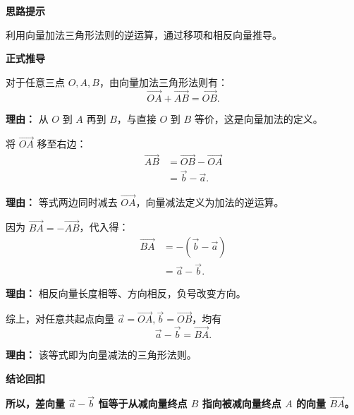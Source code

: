 \begin{proofbox}

	\textbf{\textcolor{CProof}{思路提示}}

	利用向量加法三角形法则的逆运算，通过移项和相反向量推导。

	\medskip
	\textbf{\textcolor{CProof}{正式推导}}
	\begin{description}[style=nextline, leftmargin=2.8em, labelsep=0.5em, itemsep=0.55em]
		\item[\textbf{步骤一（加法关系）：}] 对于任意三点 $O,A,B$，由向量加法三角形法则有：
			\[
				\overrightarrow{OA}+\overrightarrow{AB}=\overrightarrow{OB}.
			\]
			\par\textbf{理由：}
			从 $O$ 到 $A$ 再到 $B$，与直接 $O$ 到 $B$ 等价，这是向量加法的定义。

		\item[\textbf{步骤二（移项变形）：}] 将 $\overrightarrow{OA}$ 移至右边：
			\[
				\begin{aligned}
					\overrightarrow{AB} &= \overrightarrow{OB} - \overrightarrow{OA} \\
					&= \vec{b} - \vec{a}.
			\end{aligned}
			\]
			\par\textbf{理由：}
			等式两边同时减去 $\overrightarrow{OA}$，向量减法定义为加法的逆运算。

		\item[\textbf{步骤三（取相反向量）：}] 因为 $\overrightarrow{BA}=-\overrightarrow{AB}$，代入得：
			\[
				\begin{aligned}
					\overrightarrow{BA} &= -(\vec{b} - \vec{a}) \\
					&= \vec{a} - \vec{b}.
			\end{aligned}
			\]
			\par\textbf{理由：}
			相反向量长度相等、方向相反，负号改变方向。

		\item[\textbf{步骤四（公理化表述）：}] 综上，对任意共起点向量 $\vec{a}=\overrightarrow{OA},\vec{b}=\overrightarrow{OB}$，均有
			\[
				\boxed{\vec{a}-\vec{b}=\overrightarrow{BA}}.
			\]
			\par\textbf{理由：}
			该等式即为向量减法的三角形法则。
	\end{description}

	\medskip
	\textbf{\textcolor{CProof}{结论回扣}}

	\textbf{所以，差向量 $\vec{a}-\vec{b}$ 恒等于从减向量终点 $B$ 指向被减向量终点 $A$ 的向量 $\overrightarrow{BA}$。}
\end{proofbox}

